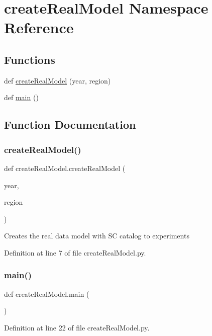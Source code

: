 \hypertarget{namespacecreate_real_model}{}\section{create\+Real\+Model Namespace Reference}
\label{namespacecreate_real_model}
\subsection*{Functions}
\begin{DoxyCompactItemize}
\item 
def \hyperlink{namespacecreate_real_model_a2d2e1d2df2335da46236b0155896d592}{create\+Real\+Model} (year, region)
\item 
def \hyperlink{namespacecreate_real_model_a6db2811f7d16ceb54e2a8c8b76ce6aa1}{main} ()
\end{DoxyCompactItemize}


\subsection{Function Documentation}
\mbox{\label{namespacecreate_real_model_a2d2e1d2df2335da46236b0155896d592}} 
\subsubsection{\texorpdfstring{create\+Real\+Model()}{createRealModel()}}
{\footnotesize\ttfamily def create\+Real\+Model.\+create\+Real\+Model (\begin{DoxyParamCaption}\item[{}]{year,  }\item[{}]{region }\end{DoxyParamCaption})}

\begin{DoxyVerb}Creates the real data model with SC catalog to experiments
\end{DoxyVerb}
 

Definition at line 7 of file create\+Real\+Model.\+py.

\mbox{\label{namespacecreate_real_model_a6db2811f7d16ceb54e2a8c8b76ce6aa1}} 
\subsubsection{\texorpdfstring{main()}{main()}}
{\footnotesize\ttfamily def create\+Real\+Model.\+main (\begin{DoxyParamCaption}{ }\end{DoxyParamCaption})}



Definition at line 22 of file create\+Real\+Model.\+py.

